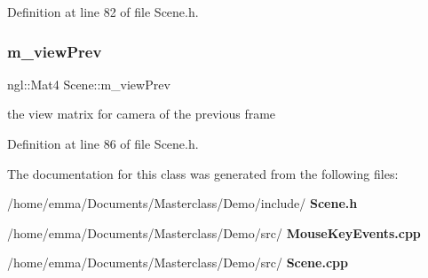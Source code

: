 Definition at line 82 of file Scene.\+h.

\mbox{\label{class_scene_a339de74eaa7314e454ccd17e1a626f57}} 
\subsubsection{m\_viewPrev}
{\footnotesize\ttfamily ngl\+::\+Mat4 Scene\+::m\+\_\+view\+Prev\hspace{0.3cm}{\ttfamily [private]}}



the view matrix for camera of the previous frame 



Definition at line 86 of file Scene.\+h.



The documentation for this class was generated from the following files\+:\begin{DoxyCompactItemize}
\item 
/home/emma/\+Documents/\+Masterclass/\+Demo/include/\textbf{ Scene.\+h}\item 
/home/emma/\+Documents/\+Masterclass/\+Demo/src/\textbf{ Mouse\+Key\+Events.\+cpp}\item 
/home/emma/\+Documents/\+Masterclass/\+Demo/src/\textbf{ Scene.\+cpp}\end{DoxyCompactItemize}
